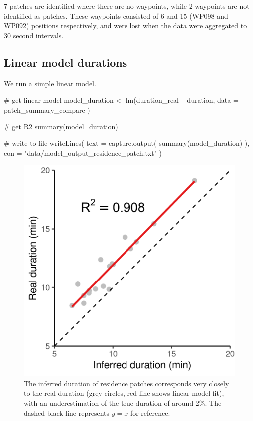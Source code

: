 \documentclass[]{scrreprt}
\newenvironment{Shaded}{}{}
\newcommand{\CommentTok}[1]{\textcolor[rgb]{0.00,0.50,0.00}{#1}}
\newcommand{\DataTypeTok}[1]{#1}
\newcommand{\KeywordTok}[1]{\textcolor[rgb]{0.00,0.00,1.00}{#1}}
\newcommand{\NormalTok}[1]{#1}
\newcommand{\OperatorTok}[1]{#1}
\newcommand{\StringTok}[1]{\textcolor[rgb]{0.00,0.50,0.50}{#1}}
\begin{document}
7 patches are identified where there are no waypoints, while 2 waypoints are not identified as patches. These waypoints consisted of 6 and 15 (WP098 and WP092) positions respectively, and were lost when the data were aggregated to 30 second intervals.

\hypertarget{linear-model-durations}{%
\subsection{Linear model durations}\label{linear-model-durations}}

We run a simple linear model.

\begin{Shaded}
\begin{Highlighting}[]
\CommentTok{# get linear model}
\NormalTok{model_duration <-}\StringTok{ }\KeywordTok{lm}\NormalTok{(duration_real }\OperatorTok{~}\StringTok{ }\NormalTok{duration,}
  \DataTypeTok{data =}\NormalTok{ patch_summary_compare}
\NormalTok{)}

\CommentTok{# get R2}
\KeywordTok{summary}\NormalTok{(model_duration)}

\CommentTok{# write to file}
\KeywordTok{writeLines}\NormalTok{(}
  \DataTypeTok{text =} \KeywordTok{capture.output}\NormalTok{(}
    \KeywordTok{summary}\NormalTok{(model_duration)}
\NormalTok{  ),}
  \DataTypeTok{con =} \StringTok{"data/model_output_residence_patch.txt"}
\NormalTok{)}
\end{Highlighting}
\end{Shaded}

\begin{figure}
\centering
\includegraphics{figures/fig_calib_lm_duration.png}
\caption{The inferred duration of residence patches corresponds very closely to the real duration (grey circles, red line shows linear model fit), with an underestimation of the true duration of around 2\%. The dashed black line represents \(y = x\) for reference.}
\end{figure}
\end{document}
